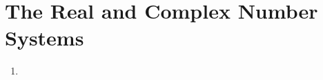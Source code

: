 
\chapter{The Real and Complex Number Systems}
\label{ch:01}

\begin{enumerate}
\item 
\end{enumerate}

